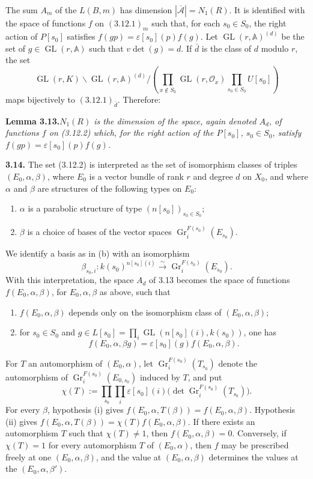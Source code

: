 \documentclass[11pt]{article}
\newcommand{\GL}{\operatorname{GL}}
\newcommand{\Gr}{\operatorname{Gr}}
\newcommand{\Acal}{\mathcal{A}}
\newcommand{\Adele}{\mathbb{A}}
\newcommand{\para}[1]{\medskip\noindent\textbf{#1}\enspace}
\begin{document}
The sum \(A_m\) of the \(L(B,m)\) has dimension \(|\overline{\Acal}|=N_1(R)\). It is identified with the space of functions \(f\) on \((3.12.1)_m\) such that, for each \(s_0\in S_0\), the right action of \(P[s_0]\) satisfies \(f(gp)=\varepsilon[s_0](p)f(g)\). Let \(\GL(r,\Adele)^{(d)}\) be the set of \(g\in\GL(r,\Adele)\) such that \(v\det(g)=d\). If \(\bar d\) is the class of \(d\) modulo \(r\), the set
\begin{equation}
\GL(r,K)\backslash\GL(r,\Adele)^{(d)}\Big/\left(\prod_{x\notin S_0}\GL(r,\mathcal O_x)\prod_{s_0\in S_0}U[s_0]\right)
\tag{3.12.2}
\end{equation}
maps bijectively to \((3.12.1)_{\bar d}\). Therefore:

\noindent\textbf{Lemma 3.13.}\quad\textit{\(N_1(R)\) is the dimension of the space, again denoted \(A_d\), of functions \(f\) on (3.12.2) which, for the right action of the \(P[s_0]\), \(s_0\in S_0\), satisfy \(f(gp)=\varepsilon[s_0](p)f(g)\).}

\para{3.14.} The set (3.12.2) is interpreted as the set of isomorphism classes of triples \((E_0,\alpha,\beta)\), where \(E_0\) is a vector bundle of rank \(r\) and degree \(d\) on \(X_0\), and where \(\alpha\) and \(\beta\) are structures of the following types on \(E_0\):
\begin{enumerate}[label=(\alph*),leftmargin=2.5em]
\item \(\alpha\) is a parabolic structure of type \((n[s_0])_{s_0\in S_0}\);
\item \(\beta\) is a choice of bases of the vector spaces \(\Gr_i^{F(s_0)}(E_{s_0})\).
\end{enumerate}
We identify a basis as in (b) with an isomorphism
\[
  \beta_{s_0,i}:k(s_0)^{n[s_0](i)}\xrightarrow{\sim}\Gr_i^{F(s_0)}(E_{s_0}).
\]
With this interpretation, the space \(A_d\) of 3.13 becomes the space of functions \(f(E_0,\alpha,\beta)\), for \(E_0,\alpha,\beta\) as above, such that
\begin{enumerate}[label=(\roman*),leftmargin=2.5em]
\item \(f(E_0,\alpha,\beta)\) depends only on the isomorphism class of \((E_0,\alpha,\beta)\);
\item for \(s_0\in S_0\) and \(g\in L[s_0]=\prod_i\GL(n[s_0](i),k(s_0))\), one has
\[
  f(E_0,\alpha,\beta g)=\varepsilon[s_0](g)f(E_0,\alpha,\beta).
\]
\end{enumerate}
For \(T\) an automorphism of \((E_0,\alpha)\), let \(\Gr_i^{F(s_0)}(T_{s_0})\) denote the automorphism of \(\Gr_i^{F(s_0)}(E_{0,s_0})\) induced by \(T\), and put
\begin{equation}
  \chi(T):=\prod_{s_0}\prod_i \varepsilon[s_0](i)\bigl(\det \Gr_i^{F(s_0)}(T_{s_0})\bigr).
\tag{3.14.1}
\end{equation}
For every \(\beta\), hypothesis (i) gives \(f(E_0,\alpha,T(\beta))=f(E_0,\alpha,\beta)\). Hypothesis (ii) gives \(f(E_0,\alpha,T(\beta))=\chi(T)f(E_0,\alpha,\beta)\). If there exists an automorphism \(T\) such that \(\chi(T)\neq1\), then \(f(E_0,\alpha,\beta)=0\). Conversely, if \(\chi(T)=1\) for every automorphism \(T\) of \((E_0,\alpha)\), then \(f\) may be prescribed freely at one \((E_0,\alpha,\beta)\), and the value at \((E_0,\alpha,\beta)\) determines the values at the \((E_0,\alpha,\beta')\).
\end{document}
